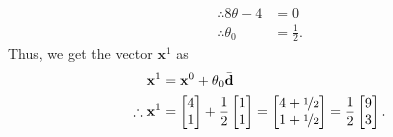 \documentclass[a4paper,11pt]{article}
\newcommand{\ds}{\displaystyle}
\begin{document}
{{\begin{enumerate}[leftmargin=*]
\begin{enumerate}[label=\alph*)]
\begin{align*}
						\therefore 8\theta - 4 & = 0\\
						\therefore \theta_0 & = \frac{1}{2}.
					\end{align*}
					Thus, we get the vector $\ds{\mathbf{x}^1}$ as 
					\begin{align*}
						\mathbf{x}^1 & = \mathbf{x}^0 + \theta_0 \bar{\mathbf{d}} \\
						\therefore \mathbf{x}^1 & =
						\begin{bmatrix}
							4 \\
							1 \\
						\end{bmatrix} + \frac{1}{2}
						\begin{bmatrix}
							1 \\
							1 \\
						\end{bmatrix} =
						\begin{bmatrix}
							4 + \nicefrac{1}{2} \\
							1 + \nicefrac{1}{2} \\
						\end{bmatrix} = \frac{1}{2}
						\begin{bmatrix}
							9 \\
							3 \\
						\end{bmatrix}.
					\end{align*}


\end{enumerate}
\end{enumerate}}}
\end{document}
